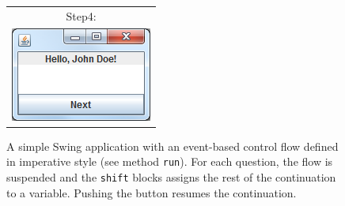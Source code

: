 \begin{figure}
\begin{minipage}{.3\linewidth}
\begin{tabular}{c}
Step4:\\
\includegraphics[width=0.9\linewidth]{images/swing-demo-step4.png} \\
\end{tabular}

    \end{minipage} 


\caption{A simple Swing application with an event-based control flow defined in imperative style (see method \texttt{run}). For each question, the flow is suspended and the \texttt{shift} blocks assigns the rest of the continuation to a variable. Pushing the button resumes the continuation.}
\label{fig:example_twelve_days}
\end{figure}
























